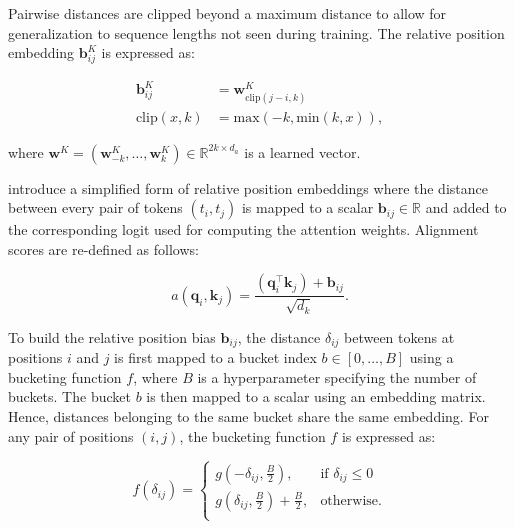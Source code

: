 \noindent Pairwise distances are clipped beyond a maximum distance to allow for generalization to sequence lengths not seen during training. The relative position embedding $\bm{b}^K_{ij}$ is expressed as:

\begin{equation}
\begin{aligned}
    \bm{b}^K_{ij} &= \bm{w}^K_{\text{clip}(j-i, k)} \\
    \text{clip}(x, k) &= \text{max}(-k, \text{min}(k, x)),
\end{aligned}
\end{equation}

\noindent where $\bm{w}^K = (\bm{w}^K_{-k}, \ldots, \bm{w}^K_{k}) \in \mathbb{R}^{2k \times d_a}$ is a learned vector.

\citet{raffel2020exploring} introduce a simplified form of relative position embeddings where the distance between every pair of tokens $(t_i, t_j)$ is mapped to a scalar $\bm{b}_{ij} \in \mathbb{R}$ and added to the corresponding logit used for computing the attention weights. Alignment scores are re-defined as follows:

\begin{equation}
    a(\bm{q}_i, \bm{k}_j) = \frac{(\bm{q}_i^{\top} \bm{k}_j) + \bm{b}_{ij}}{\sqrt{d_k}}.
\end{equation}

\noindent To build the relative position bias $\bm{b}_{ij}$, the distance $\delta_{ij}$ between tokens at positions $i$ and $j$ is first mapped to a bucket index $b \in [0, \ldots, B]$ using a bucketing function $f$, where $B$ is a hyperparameter specifying the number of buckets. The bucket $b$ is then mapped to a scalar using an embedding matrix. Hence, distances belonging to the same bucket share the same embedding. For any pair of positions $(i, j)$, the bucketing function $f$ is expressed as:

\begin{equation}
    f(\delta_{ij}) = 
    \begin{cases}
        g\left(-\delta_{ij}, \frac{B}{2}\right), & \text{if } \delta_{ij} \leq 0 \\
        g\left(\delta_{ij}, \frac{B}{2}\right) + \frac{B}{2}, & \text{otherwise.} \\
    \end{cases}
\end{equation}


